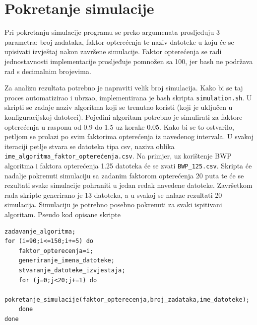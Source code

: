 \documentclass[../zavrsni.tex]{subfiles}
\begin{document}
\section{Pokretanje simulacije}

Pri pokretanju simulacije programu se preko argumenata prosljeđuju 3 parametra: broj zadataka, 
faktor opterećenja te naziv datoteke u koju će se upisivati izvještaj nakon završene simulacije.
Faktor opterećenja se radi jednostavnosti implementacije prosljeđuje pomnožen sa 100, jer bash ne podržava rad s decimalnim brojevima.

Za analizu rezultata potrebno je napraviti velik broj simulacija. Kako bi se taj proces automatizirao i ubrzao, implementirana 
je bash skripta \texttt{simulation.sh}. U skripti se zadaje naziv algoritma koji se trenutno koristi (koji je uključen u 
konfiguracijskoj datoteci). Pojedini algoritam potrebno je simulirati za faktore opterećenja u rasponu od 0.9 do 1.5 uz korake 0.05.
Kako bi se to ostvarilo, petljom se prolazi po svim faktorima opterećenja iz navedenog intervala. U svakoj iteraciji petlje stvara se datoteka tipa
csv, naziva oblika \texttt{{ime\_algoritma}\_{faktor\_opterećenja}.csv}. Na primjer, uz korištenje BWP algoritma i faktora opterećenja 1.25 
datoteka će se zvati \texttt{BWP\_125.csv}. Skripta će nadalje pokrenuti simulaciju sa zadanim faktorom opterećenja 20 puta te će se rezultati 
svake simulacije pohraniti u jedan redak navedene datoteke. Završetkom rada skripte generirano je 13 datoteka, a u svakoj se nalaze rezultati 
20 simulacija. Simulaciju je potrebno posebno pokrenuti za svaki ispitivani algoritam. Pseudo kod opisane skripte  

\begin{lstlisting}[style=CStyle,caption={Pseudo kod skripte \texttt{simulation.sh}},captionpos=b]
zadavanje_algoritma;
for (i=90;i<=150;i+=5) do
	faktor_opterecenja=i;
	generiranje_imena_datoteke;
	stvaranje_datoteke_izvjestaja;
	for (j=0;j<20;j+=1) do
		pokretanje_simulacije(faktor_opterecenja,broj_zadataka,ime_datoteke);
	done
done
\end{lstlisting}
\end{document}
